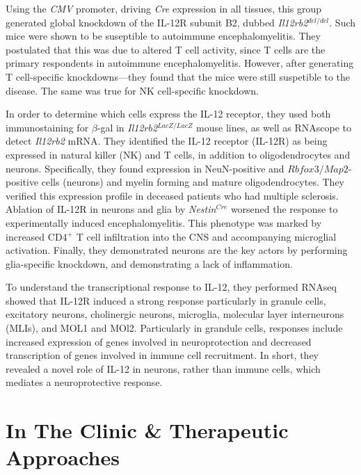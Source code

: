 \documentclass[12pt]{report}
\begin{document}
Using the \textit{CMV} promoter, driving \textit{Cre} expression in all tissues, this group generated global knockdown of the IL-12R subunit B2, dubbed \textit{Il12rb2}$^{del/del}$. Such mice were shown to be suseptible to autoimmune encephalomyelitis. They postulated that this was due to altered T cell activity, since T cells are the primary respondents in autoimmune encephalomyelitis. However, after generating T cell-specific knockdowns---they found that the mice were still suspetible to the disease. The same was true for NK cell-specific knockdown.\newline

In order to determine which cells express the IL-12 receptor, they used both immunostaining for $\beta$-gal in \textit{Il12rb2}$^{LacZ/LacZ}$ mouse lines, as well as RNAscope to detect \textit{Il12rb2} mRNA. They identified the IL-12 receptor (IL-12R) as being expressed in natural killer (NK) and T cells, in addition to oligodendrocytes and neurons. Specifically, they found expression in NeuN-positive and $Rbfox3/Map2$-positive cells (neurons) and myelin forming and mature oligodendrocytes. They verified this expression profile in deceased patients who had multiple sclerosis. Ablation of IL-12R in neurons and glia by \textit{Nestin}$^{Cre}$ worsened the response to experimentally induced encephalomyelitis. This phenotype was marked by increased CD4$^+$ T cell infiltration into the CNS and accompanying microglial activation. Finally, they demonstrated neurons are the key actors by performing glia-specific knockdown, and demonstrating a lack of inflammation. \newline

To understand the transcriptional response to IL-12, they performed RNAseq showed that IL-12R induced a strong response particularly in granule cells, excitatory neurons, cholinergic neurons, microglia, molecular layer interneurons (MLIs), and MOL1 and MOl2. Particularly in grandule cells, responses include increased expression of genes involved in neuroprotection and decreased transcription of genes involved in immune cell recruitment. In short, they revealed a novel role of IL-12 in neurons, rather than immune cells, which mediates a neuroprotective response. 



\chapter{In The Clinic \& Therapeutic Approaches}
\end{document}
